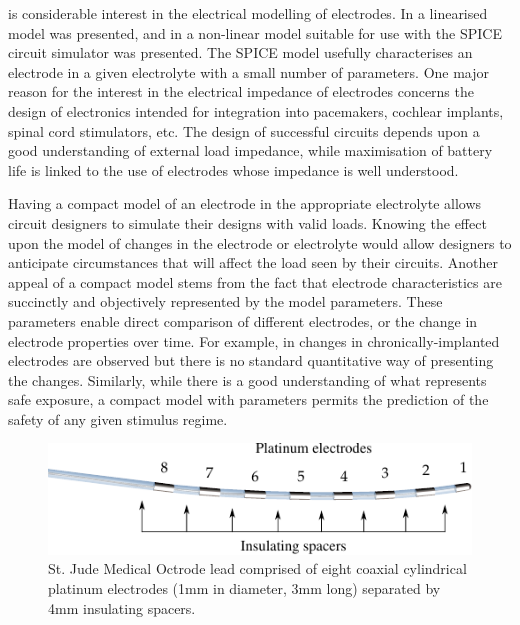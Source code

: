 \documentclass[journal, a4paper]{IEEEtran}
\begin{document}
 is considerable interest in the electrical modelling of electrodes. \cite{Cogan2008,Troy2006}
In \cite{Franks2005} a linearised model was presented, and in \cite{ScottSingle2013} a non-linear model
suitable for use with the SPICE circuit simulator was presented. The SPICE model usefully characterises an electrode in a given electrolyte with a small number of parameters.
One major reason for the interest in the electrical impedance of electrodes concerns the design of electronics intended for integration into pacemakers, cochlear implants, spinal cord stimulators, etc. The design of successful circuits depends upon a good understanding of external load impedance, while maximisation of battery life is linked to the use of electrodes whose impedance is well understood.

Having a compact model of an electrode in the appropriate electrolyte allows circuit designers to simulate their designs with valid loads. Knowing the effect upon the model of changes in the electrode or electrolyte would allow designers to anticipate circumstances that will affect the load seen by their circuits. Another appeal of a compact model stems from the fact that electrode characteristics are succinctly and objectively represented by the model parameters. These parameters enable direct comparison of different electrodes, or the change in electrode properties over time. For example, in \cite{Kane13} changes in chronically-implanted electrodes are observed but there is no standard quantitative way of presenting the changes. Similarly, while there is a good understanding of what represents safe exposure, a compact model with parameters permits the prediction of the safety of any given stimulus regime.~\cite{Merrill05}

\begin{figure}
    \begin{center}
    \includegraphics{graphics/StJudeOctrodeDiagram}
    \end{center}
    \caption{St. Jude Medical Octrode lead comprised of eight coaxial cylindrical platinum electrodes (1mm in diameter, 3mm long) separated by 4mm insulating spacers.}
    \label{fig:octrode}
\end{figure}
\end{document}
